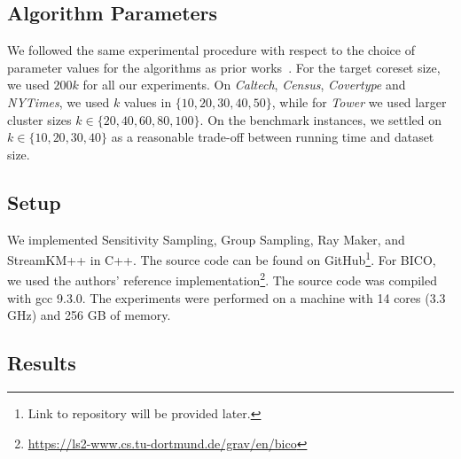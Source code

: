 \subsection{Algorithm Parameters}
We followed the same experimental procedure with respect to the choice of parameter values for the algorithms as prior works~\cite{AckermannMRSLS12, FGSSS13}. For the target coreset size, we used $200k$ for all our experiments. On \textit{Caltech}, \textit{Census},  \textit{Covertype} and \textit{NYTimes}, we used $k$ values in $\{10, 20, 30, 40, 50\}$, while for \textit{Tower} we used larger cluster sizes $k \in \{20, 40, 60, 80, 100\}$. On the benchmark instances, we settled on $k \in \{10, 20, 30, 40\}$ as a reasonable trade-off between running time and dataset size.



\subsection{Setup}
We implemented Sensitivity Sampling, Group Sampling, Ray Maker, and StreamKM++ in C++. The source code can be found on GitHub\footnote{Link to repository will be provided later.}. For BICO, we used the authors' reference implementation\footnote{\url{https://ls2-www.cs.tu-dortmund.de/grav/en/bico}}. The source code was compiled with gcc 9.3.0. The experiments were performed on a machine with 14 cores (3.3 GHz) and 256 GB of memory.

\subsection{Results}

